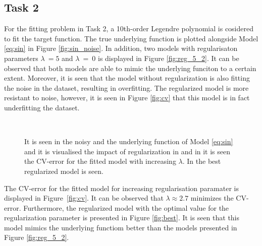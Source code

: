 \documentclass[a4paper,10pt]{article}
\begin{document}
\subsection{Task 2}
For the fitting problem in Task 2, a 10th-order Legendre polynomial is cosidered to
fit the target function. The true underlying function is plotted alongside
Model {\ref{eq:sin}} in Figure {\ref{fig:sin_noise}}. In addition,
two models with regularisaton parameters $\lambda\ = 5$ and $\lambda\ =\ 0$ is displayed in
Figure {\ref{fig:reg_5_2}}. It can be observed that both models are able to mimic
the underlying funciton to a certain extent. Moreover, it is seen that the model
without regularization is also fitting the noise in the dataset, resulting in
overfitting. The regularized model is more resistant to noise, however, it is seen
in Figure {\ref{fig:cv}} that this model is in fact underfitting the dataset.

\begin{figure}[H]
   \\
  \caption{It is seen in \protect {} the noisy and the underlying function
  of Model {\ref{eq:sin}} and it is visualised the impact of regularization in
  \protect {} and
  in \protect {} it is seen the
  CV-error for the fitted model with increasing $\lambda$. In \protect
   the best regularized model is seen.
  }
\end{figure}

The CV-error for the fitted model for increasing regularisation paramater
is displayed in Figure {\ref{fig:cv}}. It can be observed that
$\lambda \approx 2.7$ minimizes the CV-error. Furthermore, the regularized
model with the optimal value for the regularization parameter is
presented in Figure {\ref{fig:best}}. It is seen that this model
mimics the underlying functiom better than the models
presented in Figure {\ref{fig:reg_5_2}}.
\end{document}
